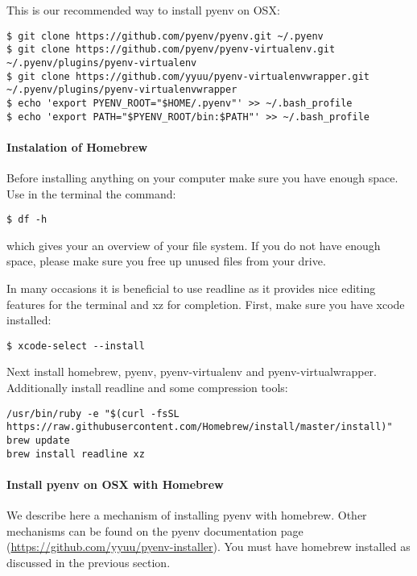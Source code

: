 This is our recommended way to install pyenv on OSX:

\begin{verbatim}
$ git clone https://github.com/pyenv/pyenv.git ~/.pyenv
$ git clone https://github.com/pyenv/pyenv-virtualenv.git ~/.pyenv/plugins/pyenv-virtualenv
$ git clone https://github.com/yyuu/pyenv-virtualenvwrapper.git ~/.pyenv/plugins/pyenv-virtualenvwrapper
$ echo 'export PYENV_ROOT="$HOME/.pyenv"' >> ~/.bash_profile
$ echo 'export PATH="$PYENV_ROOT/bin:$PATH"' >> ~/.bash_profile
\end{verbatim}

\paragraph{Instalation of Homebrew}\label{instalation-of-homebrew}

Before installing anything on your computer make sure you have enough
space. Use in the terminal the command:

\begin{verbatim}
$ df -h
\end{verbatim}

which gives your an overview of your file system. If you do not have
enough space, please make sure you free up unused files from your drive.

In many occasions it is beneficial to use readline as it provides nice
editing features for the terminal and xz for completion. First, make
sure you have xcode installed:

\begin{verbatim}
$ xcode-select --install
\end{verbatim}

Next install homebrew, pyenv, pyenv-virtualenv and pyenv-virtualwrapper.
Additionally install readline and some compression tools:

\begin{verbatim}
/usr/bin/ruby -e "$(curl -fsSL https://raw.githubusercontent.com/Homebrew/install/master/install)"
brew update
brew install readline xz
\end{verbatim}

\paragraph{Install pyenv on OSX with
Homebrew}\label{install-pyenv-on-osx-with-homebrew}

We describe here a mechanism of installing pyenv with homebrew. Other
mechanisms can be found on the pyenv documentation page
(\url{https://github.com/yyuu/pyenv-installer}). You must have homebrew
installed as discussed in the previous section.

